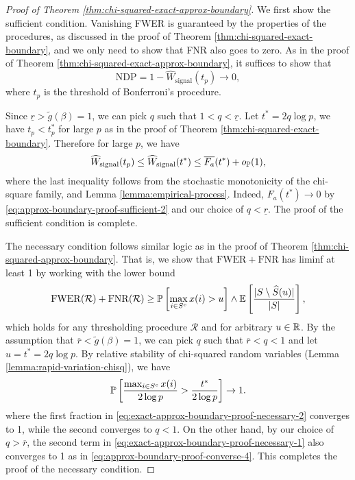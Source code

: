 \begin{proof}[Proof of Theorem \ref{thm:chi-squared-exact-approx-boundary}]
We first show the sufficient condition.
Vanishing FWER is guaranteed by the properties of the procedures, as discussed in the proof  of Theorem \ref{thm:chi-squared-exact-boundary}, and we only need to show that FNR also goes to zero. 
As in the proof of Theorem \ref{thm:chi-squared-exact-approx-boundary}, it suffices to show that
\begin{equation} \label{eq:exact-approx-boundary-proof-sufficient-1}
    \text{NDP} = 1 - \widehat{W}_\text{signal}(t_p) \to 0,
\end{equation}
where $t_p$ is the threshold of Bonferroni's procedure.

Since $\underline{r}>\widetilde{g}(\beta)=1$, we can pick $q$ such that $1<q<\underline{r}$.
Let $t^* = 2q\log{p}$, we have $t_p<t_p^*$ for large $p$ as in the proof of Theorem \ref{thm:chi-squared-exact-boundary}.
Therefore for large $p$, we have
$$
\widehat{W}_\text{signal}(t_p) \le \widehat{W}_\text{signal}(t^*) \le \overline{F_a}(t^*) + o_\P(1),
$$
where the last inequality follows from the stochastic monotonicity of the chi-square family, and Lemma \ref{lemma:empirical-process}.
Indeed, $F_a(t^*)\to0$ by \eqref{eq:approx-boundary-proof-sufficient-2} and our choice of $q<\underline{r}$. 
The proof of the sufficient condition is complete.

The necessary condition follows similar logic as in the proof of Theorem \ref{thm:chi-squared-approx-boundary}.
That is, we show that $\mathrm{FWER} + \mathrm{FNR}$ has liminf at least 1 by working with the lower bound
\begin{equation} \label{eq:exact-approx-boundary-proof-necessary-1}
    \mathrm{FWER}(\mathcal{R}) + \mathrm{FNR}(\mathcal{R}) \ge \P\left[\max_{i\in S^c}x(i)>u\right] \wedge \E\left[\frac{|S\setminus \widehat{S}(u)|}{|S|}\right],
\end{equation}
which holds for any thresholding procedure $\mathcal{R}$ and for arbitrary $u\in\R$.
By the assumption that $\overline{r}<\widetilde{g}(\beta)=1$, we can pick $q$ such that $\overline{r}<q<1$ and let $u = t^*=2q\log{p}$.
By relative stability of chi-squared random variables (Lemma \ref{lemma:rapid-variation-chisq}), we have
\begin{equation} \label{eq:exact-approx-boundary-proof-necessary-2}
    \P\left[\frac{\max_{i\in S^c} x(i)}{2\log{p}} > \frac{t^*}{2\log{p}}\right] \to 1.
\end{equation}
where the first fraction in \eqref{eq:exact-approx-boundary-proof-necessary-2} converges to 1, while the second converges to $q<1$.
On the other hand, by our choice of $q>\overline{r}$, the second term in \eqref{eq:exact-approx-boundary-proof-necessary-1} also converges to 1 as in \eqref{eq:approx-boundary-proof-converse-4}.
This completes the proof of the necessary condition.
\end{proof}

